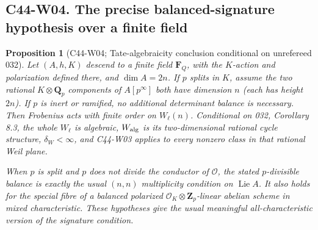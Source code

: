 \documentclass[11pt]{article}
\newtheorem{proposition}[theorem]{Proposition}
\theoremstyle{remark}\newtheorem{remark}[theorem]{Remark}
\begin{document}
\subsection*{C44-W04. The precise balanced-signature hypothesis over a finite field}

\begin{proposition}[C44-W04; Tate-algebraicity conclusion conditional on unrefereed 032]
Let $(A,h,K)$ descend to a finite field $\mathbf F_Q$, with the
$K$-action and polarization defined there, and $\dim A=2n$.
If $p$ splits in $K$, assume the two rational $K\otimes\mathbf Q_p$
components of $A[p^\infty]$ both have dimension $n$ (each has
height $2n$).  If $p$ is inert or ramified, no additional determinant
balance is necessary.  Then Frobenius acts with finite order on
$W_\ell(n)$.  Conditional on 032, Corollary 8.3, the whole
$W_\ell$ is algebraic, $W_{\rm alg}$ is its two-dimensional
rational cycle structure, $\delta_W<\infty$, and C44-W03 applies
to every nonzero class in that rational Weil plane.

When $p$ is split and $p$ does not divide the conductor of
$\mathcal O$, the stated $p$-divisible balance is exactly the usual
$(n,n)$ multiplicity condition on $\operatorname{Lie}A$.
It also holds for the special fibre of a balanced polarized
$\mathcal O_K\otimes\mathbf Z_p$-linear abelian scheme in mixed
characteristic.  These hypotheses give the usual meaningful
all-characteristic version of the signature condition.
\end{proposition}
\end{document}
